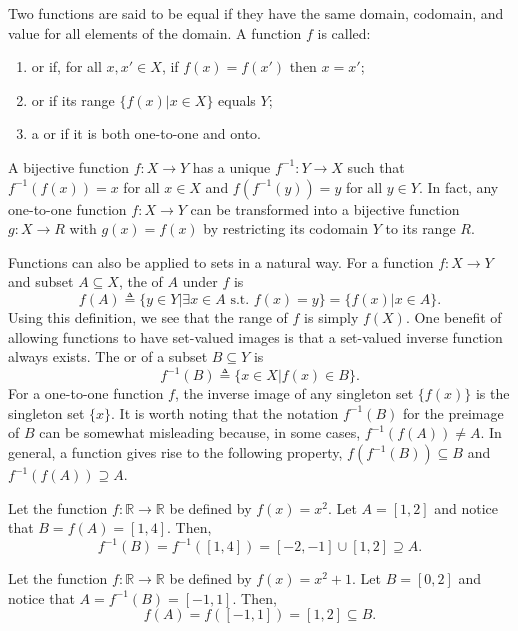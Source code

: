 Two functions are said to be equal if they have the same domain, codomain, and value for all elements of the domain.
A function $f$ is called:
\begin{enumerate}
\item {} or  if, for all $x,x'\in X$, if $f(x)=f(x')$ then $x=x'$;
\item {} or  if its range $\{ f(x) | x\in X\}$ equals $Y$;
\item a  or  if it is both one-to-one and onto.
\end{enumerate}
A bijective function $f \colon X\rightarrow Y$ has a unique  $f^{-1} \colon Y\rightarrow X$ such that $f^{-1}(f(x)) = x$ for all $x\in X$ and $f(f^{-1}(y)) = y$ for all $y\in Y$.
In fact, any one-to-one function $f \colon X\rightarrow Y$ can be transformed into a bijective function $g \colon X \rightarrow R$ with $g(x)=f(x)$ by restricting its codomain $Y$ to its range $R$.

Functions can also be applied to sets in a natural way.
For a function $f \colon X\rightarrow Y$ and subset $A\subseteq X$, the  of $A$ under $f$ is
\[ f(A) \triangleq \{ y\in Y | \exists x\in A \textrm{ s.t. } f(x)=y\} = \{f(x) | x\in A\}. \]
Using this definition, we see that the range of $f$ is simply $f(X)$.
One benefit of allowing functions to have set-valued images is that a set-valued inverse function always exists.
The  or  of a subset $B\subseteq Y$ is
\[ f^{-1}(B) \triangleq \{ x\in X | f(x)\in B\}. \]
For a one-to-one function $f$, the inverse image of any singleton set $\{ f(x) \}$ is the singleton set $\{ x \}$.
It is worth noting that the notation $f^{-1}(B)$ for the preimage of $B$ can be somewhat misleading because, in some cases, $f^{-1}(f(A)) \neq A$.
In general, a function gives rise to the following property, $f(f^{-1}(B)) \subseteq B$ and $f^{-1}(f(A)) \supseteq A$.

\begin{example}
Let the function $f \colon \mathbb{R} \rightarrow \mathbb{R}$ be defined by $f(x)=x^2$. Let $A=[1,2]$ and notice that $B = f(A) = [1,4]$.  Then,
\[ f^{-1}(B) = f^{-1}([1,4]) = [-2,-1] \cup [1,2] \supseteq A. \]
\end{example}
\begin{example}
Let the function $f \colon \mathbb{R} \rightarrow \mathbb{R}$ be defined by $f(x)=x^2+1$. Let $B=[0,2]$ and notice that $A = f^{-1}(B) = [-1,1]$.  Then,
\[ f(A) = f([-1,1]) = [1,2] \subseteq B. \]
\end{example}

